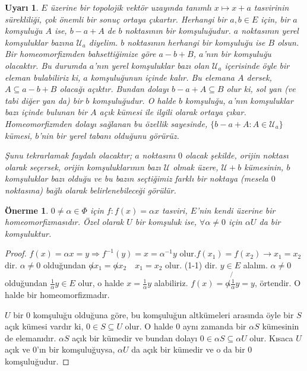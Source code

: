 \documentclass[11pt]{article}
\theoremstyle{plain}
\newtheorem{proposition}{Önerme}
\newtheorem{remark}{Uyarı}
\theoremstyle{definition}
\theoremstyle{remark}
\numberwithin{equation}{section}
\renewcommand{\%}{{\small \%}}
\begin{document}
\begin{remark} $E$ üzerine bir topolojik vektör uzayında tanımlı $x\longmapsto x+a$ tasvirinin sürekliliği, çok önemli bir sonuç ortaya çıkartır. Herhangi bir $a,b\in E$ için, bir $a$ komşuluğu $A$ ise, $b-a+A$ de $b$ noktasının bir komşuluğudur. $a$ noktasının yerel komşuluklar bazına $\mathscr{U}_a$ diyelim. $b$ noktasının herhangi bir komşuluğu ise $B$ olsun. Bir homeomorfizmden bahsettiğimize göre $a-b+B$, $a$'nın bir komşuluğu olacaktır. Bu durumda $a$'nın yerel komşuluklar bazı olan $\mathscr{U}_a$ içerisinde öyle bir eleman bulabiliriz ki, $a$ komşuluğunun içinde kalır. Bu elemana $A$ dersek, $A\subseteq a-b+B$ olacağı açıktır. Bundan dolayı $b-a+A\subseteq B$ olur ki, sol yan \emph{(ve tabi diğer yan da) }bir $b$ komşuluğudur. O halde $b$ komşuluğu, $a$'nın komşuluklar bazı içinde bulunan bir $A$ açık kümesi ile ilgili olarak ortaya çıkar. Homeomorfizmden dolayı sağlanan bu özellik sayesinde, $\{b-a+A:A\in\mathscr{U}_a\}$ kümesi, $b$'nin bir yerel tabanı olduğunu görürüz.

Şunu tekrarlamak faydalı olacaktır; $a$ noktasını $0$ olacak şekilde, orijin noktası olarak seçersek, orijin komşuluklarının bazı $\mathscr{U}$ olmak üzere, $\mathscr{U}+b$ kümesinin, $b$ komşuluklar bazı olduğu ve bu bazın seçtiğimiz farklı bir noktaya \emph{(mesela $0$ noktasına)} bağlı olarak belirlenebileceği görülür.
\end{remark}

\begin{proposition}
$0\neq\alpha\in\Phi$ için $f:f(x)=\alpha x$ tasviri, $E$'nin kendi üzerine bir homeomorfizmasıdır. Özel olarak $U$ bir komşuluk ise, $\forall\alpha\neq 0$ için $\alpha U$ da bir komşuluktur.

\end{proposition}

\begin{proof}
$f(x)=\alpha x=y\Longrightarrow f^{-1}(y)=x=\alpha^{-1}y$ olur.$f(x_1)=f(x_2)\longrightarrow x_1 =x_2$ dir. $\alpha\neq 0$ olduğundan $\not\alpha x_1 =\not\alpha x_2 \quad x_1 = x_2$ olur. (1-1) dir. $y\in E$ alalım. $\alpha\not=0$ olduğundan $\frac{1}{\alpha}y\in E$ olur, o halde $x=\frac{1}{\alpha}y$ alabiliriz. $f(x)=\not\alpha\not{\frac{1}{\alpha}}y=y$, örtendir. O halde bir homeomorfizmadır.

$U$ bir $0$ komşuluğu olduğuna göre, bu komşuluğun altkümeleri arasında öyle bir $S$ açık kümesi vardır ki, $0\in S\subseteq U$ olur. O halde $0$ aynı zamanda bir $\alpha S$ kümesinin de elemanıdır. $\alpha S$ açık bir kümedir ve bundan dolayı $0\in\alpha S\subseteq\alpha U$ olur. Kısaca $U$ açık ve $0$'ın bir komşuluğuysa, $\alpha U$ da açık bir kümedir ve o da bir $0$ komşuluğudur.\newpage
\end{proof}
\end{document}

